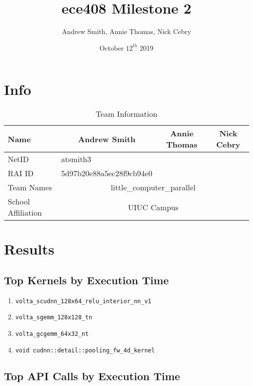 \documentclass[10pt, letter]{article}
\title{ece408 Milestone 2}
\author{Andrew Smith, Annie Thomas, Nick Cebry}
\date{October $12^{th}$ 2019}
\begin{document}
\maketitle

\section{Info}
\begin{table}[H]
\caption{Team Information}
\centering
\label{tablen:team_info}
\begin{tabular}{|l|c|l|l|}
\hline
Name               & Andrew Smith                                  & \multicolumn{1}{c|}{Annie Thomas} & \multicolumn{1}{c|}{Nick Cebry} \\ \hline
NetID              & \multicolumn{1}{l|}{atsmith3}                 &                                   &                                 \\ \hline
RAI ID             & \multicolumn{1}{l|}{5d97b20e88a5ec28f9cb94e0} &                                   &                                 \\ \hline
Team Names         & \multicolumn{3}{c|}{little\_computer\_parallel}                                                                     \\ \hline
School Affiliation & \multicolumn{3}{c|}{UIUC Campus}                                                                                    \\ \hline
\end{tabular}
\end{table}

\section{Results}
\subsection{Top Kernels by Execution Time}
\begin{enumerate}[itemsep=0pt,parsep=2pt]
  \item \verb|volta_scudnn_128x64_relu_interior_nn_v1|
  \item \verb|volta_sgemm_128x128_tn|
  \item \verb|volta_gcgemm_64x32_nt|
  \item \verb|void cudnn::detail::pooling_fw_4d_kernel|
\end{enumerate}

\subsection{Top API Calls by Execution Time}
\end{document}
